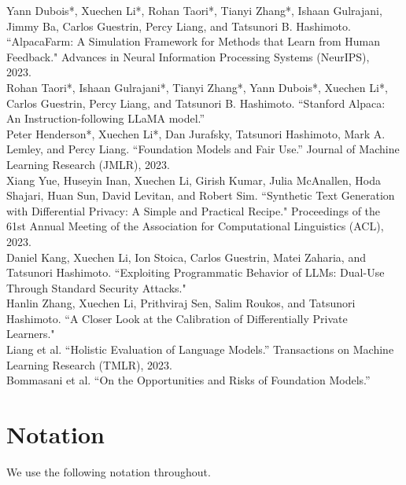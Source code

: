 \begin{verticalline}
Yann Dubois*, Xuechen Li*, Rohan Taori*, Tianyi Zhang*, Ishaan Gulrajani, Jimmy Ba, Carlos Guestrin, Percy Liang, and Tatsunori B. Hashimoto. ``AlpacaFarm: A Simulation Framework for Methods that Learn from Human Feedback."
Advances in Neural Information Processing Systems (NeurIPS), 2023.~\citep{dubois2023alpacafarm}\\

\noindent
Rohan Taori*, Ishaan Gulrajani*, Tianyi Zhang*, Yann Dubois*, Xuechen Li*, Carlos Guestrin, Percy Liang, and Tatsunori B. Hashimoto.
``Stanford Alpaca: An Instruction-following LLaMA model.''~\citep{alpaca}\\

\noindent 
Peter Henderson*, Xuechen Li*, Dan Jurafsky, Tatsunori Hashimoto, Mark A. Lemley, and Percy Liang. 
``Foundation Models and Fair Use.''
Journal of Machine Learning Research (JMLR), 2023.~\citep{henderson2023fairuse}\\

\noindent Xiang Yue, Huseyin Inan, Xuechen Li, Girish Kumar, Julia McAnallen, Hoda Shajari, Huan Sun, David Levitan, and Robert Sim. ``Synthetic Text Generation with Differential Privacy: A Simple and Practical Recipe." Proceedings of the 61st Annual Meeting of the Association for Computational Linguistics (ACL), 2023.~\citep{yue-etal-2023-synthetic}\\

\noindent 
Daniel Kang, Xuechen Li, Ion Stoica, Carlos Guestrin, Matei Zaharia, and Tatsunori Hashimoto. ``Exploiting Programmatic Behavior of LLMs: Dual-Use Through Standard Security Attacks."~\citep{kang2023exploiting}\\

\noindent 
Hanlin Zhang, Xuechen Li, Prithviraj Sen, Salim Roukos, and Tatsunori Hashimoto. 
``A Closer Look at the Calibration of Differentially Private Learners."~\citep{zhang2022closer}\\

\noindent 
Liang et al.
``Holistic Evaluation of Language Models.''
Transactions on Machine Learning Research (TMLR), 2023.~\citep{liang2023holistic}\\

\noindent 
Bommasani et al.
``On the Opportunities and Risks of Foundation Models.''~\citep{bommasani2021opportunities}

\end{verticalline}

\newpage
\section{Notation}
We use the following notation throughout.

